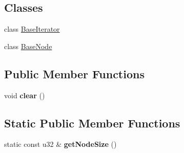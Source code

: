 \subsection*{Classes}
\begin{DoxyCompactItemize}
\item 
class \hyperlink{classDE_1_1BaseList_1_1BaseIterator}{Base\+Iterator}
\item 
class \hyperlink{classDE_1_1BaseList_1_1BaseNode}{Base\+Node}
\end{DoxyCompactItemize}
\subsection*{Public Member Functions}
\begin{DoxyCompactItemize}
\item 
void {\bfseries clear} ()\hypertarget{classDE_1_1BaseList_a1fb264de58ba818c65da7623e2d42343}{}\label{classDE_1_1BaseList_a1fb264de58ba818c65da7623e2d42343}

\end{DoxyCompactItemize}
\subsection*{Static Public Member Functions}
\begin{DoxyCompactItemize}
\item 
static const u32 \& {\bfseries get\+Node\+Size} ()\hypertarget{classDE_1_1BaseList_a022bd54e1b6af0b10d352989fc9adc34}{}\label{classDE_1_1BaseList_a022bd54e1b6af0b10d352989fc9adc34}

\end{DoxyCompactItemize}
